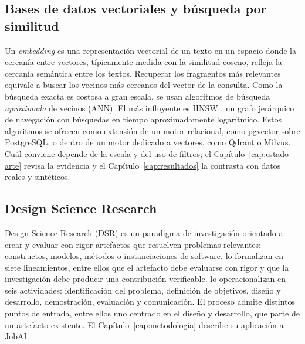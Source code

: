 \subsection{Bases de datos vectoriales y búsqueda por similitud}

Un \textit{embedding} es una representación vectorial de un texto en un espacio donde la cercanía entre vectores, típicamente medida con la similitud coseno, refleja la cercanía semántica entre los textos. Recuperar los fragmentos más relevantes equivale a buscar los vecinos más cercanos del vector de la consulta. Como la búsqueda exacta es costosa a gran escala, se usan algoritmos de búsqueda \emph{aproximada} de vecinos (ANN). El más influyente es HNSW \citep{Malkov2020}, un grafo jerárquico de navegación con búsquedas en tiempo aproximadamente logarítmico. Estos algoritmos se ofrecen como extensión de un motor relacional, como pgvector sobre PostgreSQL, o dentro de un motor dedicado a vectores, como Qdrant o Milvus. Cuál conviene depende de la escala y del uso de filtros; el Capítulo~\ref{cap:estado-arte} revisa la evidencia y el Capítulo~\ref{cap:resultados} la contrasta con datos reales y sintéticos.

\subsection{Design Science Research}
\label{sec:marco-teorico-dsr}

Design Science Research (DSR) es un paradigma de investigación orientado a crear y evaluar con rigor artefactos que resuelven problemas relevantes: constructos, modelos, métodos o instanciaciones de software. \citet{Hevner2004} lo formalizan en siete lineamientos, entre ellos que el artefacto debe evaluarse con rigor y que la investigación debe producir una contribución verificable. \citet{Peffers2007} lo operacionalizan en seis actividades: identificación del problema, definición de objetivos, diseño y desarrollo, demostración, evaluación y comunicación. El proceso admite distintos puntos de entrada, entre ellos uno centrado en el diseño y desarrollo, que parte de un artefacto existente. El Capítulo~\ref{cap:metodologia} describe su aplicación a JobAI.
